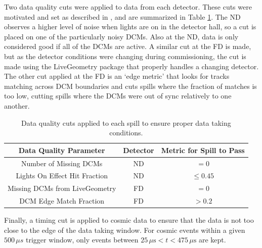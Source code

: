 Two data quality cuts were applied to data from each detector. These cuts were motivated and set as described in \cite{ref:DQND, ref:DQFDDCMLiveGeo, ref:DQFDDCMEdgeFrac}, and are summarized in Table \ref{tab:DataQual}. The ND observes a higher level of noise when lights are on in the detector hall, so a cut is placed on one of the particularly noisy DCMs. Also at the ND, data is only considered good if all of the DCMs are active. A similar cut at the FD is made, but as the detector conditions were changing during commissioning, the cut is made using the LiveGeometry package that properly handles a changing detector. The other cut applied at the FD is an `edge metric' that looks for tracks matching across DCM boundaries and cuts spills where the fraction of matches is too low, cutting spills where the DCMs were out of sync relatively to one another.
\begin{table}[h]
  \begin{center}
    \caption[Data Quality Cuts]{Data quality cuts applied to each spill to ensure proper data taking conditions.}
    \label{tab:DataQual}
    \begin{tabular}{c c c}
      \hline\hline
      Data Quality Parameter & Detector & Metric for Spill to Pass \\
      \hline
      Number of Missing DCMs & ND & $= 0$ \\
      Lights On Effect Hit Fraction & ND & $\leq 0.45$ \\
      Missing DCMs from LiveGeometry & FD & $= 0$ \\
      DCM Edge Match Fraction & FD & $> 0.2$ \\
      \hline
    \end{tabular}
  \end{center}
\end{table}

Finally, a timing cut is applied to cosmic data to ensure that the data is not too close to the edge of the data taking window. For cosmic events within a given $500\,\mu s$ trigger window, only events between $25\,\mu{\mbox{s}} < t < 475\,\mu{\mbox{s}}$ are kept.

